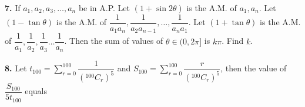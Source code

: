 \documentclass[10pt,twocolumn]{extarticle}
\begin{document}
\textbf{7.} If $a_1,a_2,a_3,\ldots,a_n$ be in A.P. Let $(1+\sin2\theta)$ is the A.M. of $a_1,a_n$. Let $(1-\tan\theta)$ is the A.M. of $\dfrac{1}{a_1a_n},\dfrac{1}{a_2a_{n-1}},\ldots,\dfrac{1}{a_na_1}$. Let $(1+\tan\theta)$ is the A.M. of $\dfrac{1}{a_1},\dfrac{1}{a_2},\dfrac{1}{a_3}\ldots\dfrac{1}{a_n}$. Then the sum of values of $\theta\in(0,2\pi]$ is $k\pi$. Find $k$.

\textbf{8.} Let $t_{100}=\displaystyle\sum_{r=0}^{100}\dfrac{1}{\left({}^{100}C_r\right)^5}$ and $S_{100}=\displaystyle\sum_{r=0}^{100}\dfrac{r}{\left({}^{100}C_r\right)^5}$, then the value of $\dfrac{S_{100}}{5t_{100}}$ equals
\end{document}
